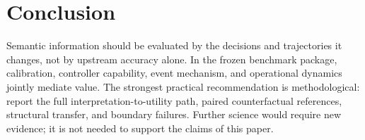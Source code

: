 \documentclass[10pt]{article}
\begin{document}
\section{Conclusion}

Semantic information should be evaluated by the decisions and trajectories it changes, not by upstream accuracy alone. In the frozen benchmark package, calibration, controller capability, event mechanism, and operational dynamics jointly mediate value. The strongest practical recommendation is methodological: report the full interpretation-to-utility path, paired counterfactual references, structural transfer, and boundary failures. Further science would require new evidence; it is not needed to support the claims of this paper.




\appendix

\end{document}
